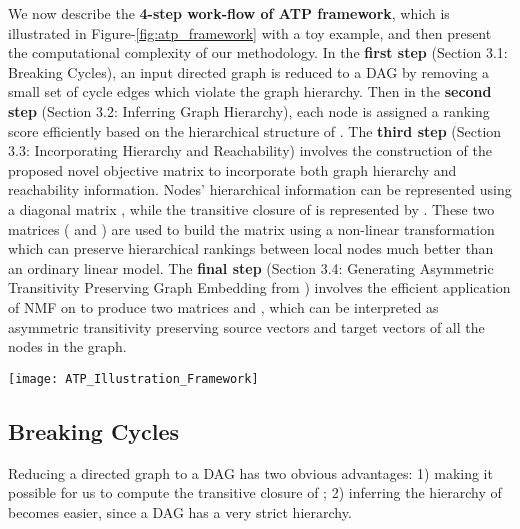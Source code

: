 \documentclass[letterpaper]{article} \usepackage{aaai19}  \usepackage{times}  \usepackage{helvet}  \usepackage{courier}  \usepackage{url}  \usepackage{graphicx}  \usepackage{booktabs} \usepackage{xcolor}
\begin{document}
We now describe the \textbf{4-step work-flow of ATP framework}, which is illustrated in Figure-\ref{fig:atp_framework} with a toy example, and then present the computational complexity of our methodology. In the \textbf{first step}  (Section 3.1: Breaking Cycles), an input directed graph  is reduced to a DAG  by removing a small set of cycle edges which violate the graph hierarchy. 
Then in the \textbf{second step} (Section 3.2: Inferring Graph Hierarchy), each node is assigned a ranking score efficiently based on the hierarchical structure of . 
The \textbf{third step} (Section 3.3: Incorporating Hierarchy and Reachability) involves the construction of the proposed novel objective matrix  to incorporate both graph hierarchy and reachability information.
Nodes' hierarchical information can be represented using a diagonal matrix , while the transitive closure of  is represented by .
These two matrices ( and ) are used to build the matrix  using a non-linear transformation which can preserve hierarchical rankings between local nodes much better than an ordinary linear model.
The \textbf{final step} (Section 3.4: Generating Asymmetric Transitivity Preserving Graph Embedding from ) involves the efficient application of NMF on  to produce two matrices  and , which can be interpreted as asymmetric transitivity preserving source vectors and target vectors of all the nodes in the graph.




\begin{figure*}[!ht]
    \centering
    \small
    \texttt{[image: ATP\_Illustration\_Framework]}
   \caption{\small Illustration of {\bf A}symmetric {\bf T}ransitivity {\bf P}reserving ({\bf ATP}) graph embedding framework} 
    \label{fig:atp_framework}
\end{figure*}




\subsection{Breaking Cycles}
\label{sec:breaking_cycles}

Reducing a directed graph  to a DAG  has two obvious advantages: 1) making it possible for us to compute the transitive closure of ; 2) inferring the hierarchy of  becomes easier, since a DAG has a very strict hierarchy. 
\end{document}
